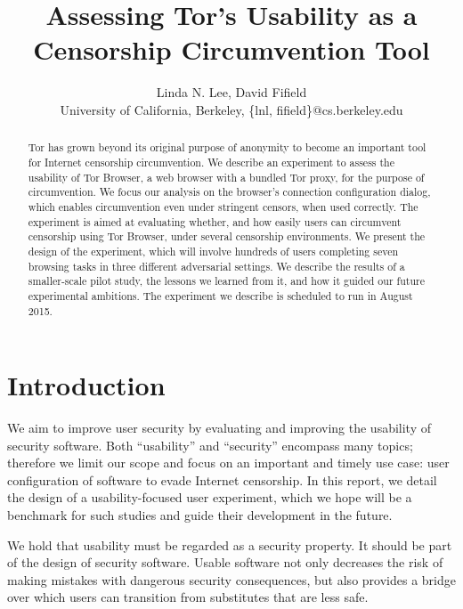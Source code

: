 \documentclass[letterpaper,twocolumn,11pt]{article}
\begin{document}
\title{Assessing Tor's Usability as a Censorship Circumvention Tool}
\author{Linda N. Lee, David Fifield\\
University of California, Berkeley, \{lnl, fifield\}@cs.berkeley.edu
}
\maketitle
 
\begin{abstract}
\indent \indent Tor has grown beyond its original purpose of anonymity
to become an important tool for
Internet censorship circumvention.
We describe an experiment to assess the usability of Tor Browser,
a web browser with a bundled Tor proxy,
for the purpose of circumvention.
We focus our analysis on the browser's connection configuration dialog,
which enables circumvention even under stringent censors,
when used correctly.
The experiment is aimed at evaluating whether, and how easily users can circumvent censorship using Tor Browser,
under several censorship environments.
We present the design of the experiment,
which will involve hundreds of users completing seven browsing tasks in three different adversarial settings.
We describe the results of a smaller-scale pilot study,
the lessons we learned from it,
and how it guided our future experimental ambitions.
The experiment we describe is scheduled to run in August 2015.
\end{abstract}

\section{Introduction}

\indent \indent We aim to improve user security by evaluating
and improving the usability of security software.
Both ``usability'' and ``security'' encompass many topics;
therefore we limit our scope and focus on
an important and timely use case:
user configuration of software to evade Internet censorship.
In this report, we detail the design of a usability-focused user experiment,
which we hope will be a benchmark for such studies
and guide their development in the future.

We hold that usability must be regarded as a security property.
It should be part of the design of security software.
Usable software not only decreases the risk of making mistakes
with dangerous security consequences,
but also provides a bridge over which users can
transition from substitutes that are less safe.
\end{document}

